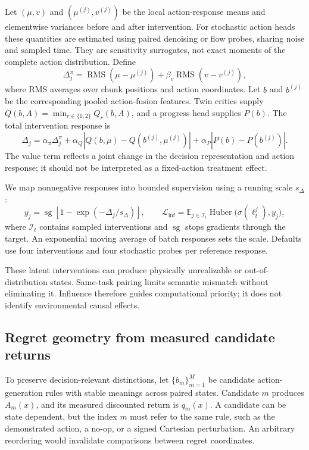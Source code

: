 \documentclass{article}
\newcommand{\sg}{\operatorname{sg}}
\newcommand{\Huber}{\operatorname{Huber}}
\newcommand{\RMS}{\operatorname{RMS}}
\newcommand{\E}{\mathbb{E}}
\begin{document}
Let $(\mu,v)$ and $(\mu^{(j)},v^{(j)})$ be the local action-response means and elementwise variances before and after intervention. For stochastic action heads these quantities are estimated using paired denoising or flow probes, sharing noise and sampled time. They are sensitivity surrogates, not exact moments of the complete action distribution. Define
\begin{equation}
\Delta_j^{\pi}=\RMS(\mu-\mu^{(j)})
+\beta_v\RMS(v-v^{(j)}),
\label{eq:policyinfluence}
\end{equation}
where RMS averages over chunk positions and action coordinates. Let $b$ and $b^{(j)}$ be the corresponding pooled action-fusion features. Twin critics supply $Q(b,A)=\min_{r\in\{1,2\}}Q_r(b,A)$, and a progress head supplies $P(b)$. The total intervention response is
\begin{equation}
\Delta_j=\alpha_\pi\Delta_j^{\pi}
+\alpha_Q\left|Q(b,\mu)-Q(b^{(j)},\mu^{(j)})\right|
+\alpha_P\left|P(b)-P(b^{(j)})\right|.
\label{eq:influence}
\end{equation}
The value term reflects a joint change in the decision representation and action response; it should not be interpreted as a fixed-action treatment effect.

We map nonnegative responses into bounded supervision using a running scale $s_\Delta$:
\begin{equation}
y_j=\sg\!\left[1-\exp(-\Delta_j/s_\Delta)\right],
\qquad
\mathcal L_{\mathrm{inf}}=
\E_{j\in\mathcal I_t}\Huber\big(\sigma(\ell_t^j),y_j\big),
\label{eq:infloss}
\end{equation}
where $\mathcal I_t$ contains sampled interventions and $\sg$ stops gradients through the target. An exponential moving average of batch responses sets the scale. Defaults use four interventions and four stochastic probes per reference response.

These latent interventions can produce physically unrealizable or out-of-distribution states. Same-task pairing limits semantic mismatch without eliminating it. Influence therefore guides computational priority; it does not identify environmental causal effects.

\subsection{Regret geometry from measured candidate returns}
\label{sec:regret}
To preserve decision-relevant distinctions, let $\{b_m\}_{m=1}^M$ be candidate action-generation rules with stable meanings across paired states. Candidate $m$ produces $A_m(x)$, and its measured discounted return is $q_m(x)$. A candidate can be state dependent, but the index $m$ must refer to the same rule, such as the demonstrated action, a no-op, or a signed Cartesian perturbation. An arbitrary reordering would invalidate comparisons between regret coordinates.
\end{document}
